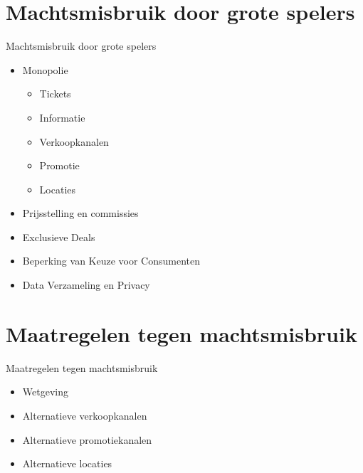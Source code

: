 \documentclass{beamer}
\begin{document}
    
    

    
\section[Machtsmisbruik]{Machtsmisbruik door grote spelers}
\begin{frame}{Machtsmisbruik door grote spelers}
    \begin{itemize}
        \item Monopolie
        \begin{itemize}
            \item Tickets
            \item Informatie
            \item Verkoopkanalen
            \item Promotie
            \item Locaties
        \end{itemize}
        \item Prijsstelling en commissies
        \item Exclusieve Deals
        \item Beperking van Keuze voor Consumenten
        \item Data Verzameling en Privacy
  \end{itemize}
\end{frame}

    
    
\section[Maatregelen]{Maatregelen tegen machtsmisbruik}
\begin{frame}{Maatregelen tegen machtsmisbruik}
    \begin{itemize}
        \item Wetgeving
        \item Alternatieve verkoopkanalen
        \item Alternatieve promotiekanalen
        \item Alternatieve locaties
    \end{itemize}
\end{frame}
   
\end{document}
